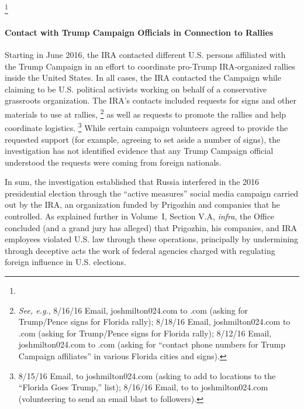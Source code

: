 \footnote{}

\paragraph{Contact with Trump Campaign Officials in Connection to Rallies}

Starting in June 2016, the IRA contacted different U.S. persons affiliated with the Trump Campaign in an effort to coordinate pro-Trump IRA-organized rallies inside the United States.
In all cases, the IRA contacted the Campaign while claiming to be U.S. political activists working on behalf of a conservative grassroots organization.
The IRA's contacts included requests for signs and other materials to use at rallies,%
\footnote{\textit{See, e.g.}, 8/16/16 Email, joshmilton024\@gmail.com to \@donaldtrump.com (asking for Trump/Pence signs for Florida rally);
8/18/16 Email, joshmilton024\@gmail.com to \@donaldtrump.com (asking for Trump/Pence signs for Florida rally);
8/12/16 Email, joshmilton024\@gmail.com to \@donaldtrump.com (asking for ``contact phone numbers for Trump Campaign affiliates'' in various Florida cities and signs).
}
as well as requests to promote the rallies and help coordinate logistics.%
\footnote{8/15/16 Email,  to joshmilton024\@gmail.com (asking to add to locations to the ``Florida Goes Trump,'' list);
8/16/16 Email, to  to joshmilton024\@gmail.com (volunteering to send an email blast to followers).}
While certain campaign volunteers agreed to provide the requested support (for example, agreeing to set aside a number of signs), the investigation has not identified evidence that any Trump Campaign official understood the requests were coming from foreign nationals.

\hr

In sum, the investigation established that Russia interfered in the 2016 presidential election through the ``active measures'' social media campaign carried out by the IRA, an organization funded by Prigozhin and companies that he controlled.
As explained further in Volume~I, Section V.A, \textit{infra}, the Office concluded (and a grand jury has alleged) that Prigozhin, his companies, and IRA employees violated U.S. law through these operations, principally by undermining through deceptive acts the work of federal agencies charged with regulating foreign influence in U.S. elections.
